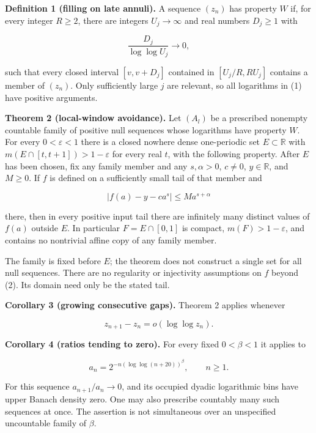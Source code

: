 \documentclass[
  11pt,
]{article}
\begin{document}
\textbf{Definition 1 (filling on late annuli).} A sequence \((z_n)\) has
property \(W\) if, for every integer \(R\ge 2\), there are integers
\(U_j\to \infty\) and real numbers \(D_j\ge 1\) with

\[
\frac{D_j}{\log\log U_j}\longrightarrow0,                 \tag{1}
\]

such that every closed interval \([v,v+D_j]\) contained in
\([U_j/R,RU_j]\) contains a member of \((z_n)\). Only sufficiently large
\(j\) are relevant, so all logarithms in (1) have positive arguments.

\textbf{Theorem 2 (local-window avoidance).} Let \((A_l)\) be a
prescribed nonempty countable family of positive null sequences whose
logarithms have property \(W\). For every \(0<\varepsilon <1\) there is
a closed nowhere dense one-periodic set \(E\subset\mathbb R\) with
\(m(E\cap [t,t+1])>1-\varepsilon\) for every real \(t\), with the
following property. After \(E\) has been chosen, fix any family member
and any \(s,\alpha >0\), \(c\ne 0\), \(y\in\mathbb R\), and \(M\ge 0\).
If \(f\) is defined on a sufficiently small tail of that member and

\[
 |f(a)-y-ca^s|\le M a^{s+\alpha}                           \tag{2}
\]

there, then in every positive input tail there are infinitely many
distinct values of \(f(a)\) outside \(E\). In particular
\(F=E\cap [0,1]\) is compact, \(m(F)>1-\varepsilon\), and contains no
nontrivial affine copy of any family member.

The family is fixed before \(E\); the theorem does not construct a
single set for all null sequences. There are no regularity or
injectivity assumptions on \(f\) beyond (2). Its domain need only be the
stated tail.

\textbf{Corollary 3 (growing consecutive gaps).} Theorem 2 applies
whenever

\[
 z_{n+1}-z_n=o(\log\log z_n).                              \tag{3}
\]

\textbf{Corollary 4 (ratios tending to zero).} For every fixed
\(0<\beta <1\) it applies to

\[
 a_n=2^{-n(\log\log(n+20))^\beta},\qquad n\ge1.            \tag{4}
\]

For this sequence \(a_{n+1}/a_n\to 0\), and its occupied dyadic
logarithmic bins have upper Banach density zero. One may also prescribe
countably many such sequences at once. The assertion is not simultaneous
over an unspecified uncountable family of \(\beta\).
\end{document}
